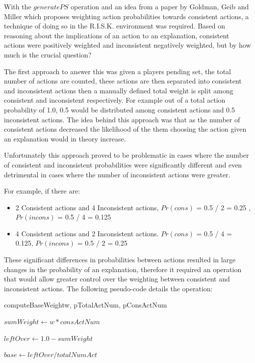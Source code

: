 \documentclass[parskip]{cs4rep}
\begin{document}
With the $generatePS$ operation and an idea from a paper by Goldman, Geib and Miller \cite{Goldman99anew} which proposes weighting action probabilities towards consistent actions, a technique of doing so in the R.I.S.K. environment was required. Based on reasoning about the implications of an action to an explanation, consistent actions were positively weighted and inconsistent negatively weighted, but by how much is the crucial question?

The first approach to answer this was given a players pending set, the total number of actions are counted, these actions are then separated into consistent and inconsistent actions then a manually defined total weight is split among consistent and inconsistent respectively. For example out of a total action probability of 1.0, 0.5 would be distributed among consistent actions and 0.5 inconsistent actions. The idea behind this approach was that as the number of consistent actions decreased the likelihood of the them choosing the action given an explanation would in theory increase.

Unfortunately this approach proved to be problematic in cases where the number of consistent and inconsistent probabilities were significantly different and even detrimental in cases where the number of inconsistent actions were greater. 

For example, if there are:

\begin{itemize}
\item
2 Consistent actions and 4 Inconsistent actions, $Pr(cons)$ = 0.5 / 2 = 0.25 , $Pr(incons)$ = 0.5 / 4 = 0.125 
\item
4 Consistent actions and 2 Inconsistent actions. $Pr(cons)$ = 0.5 / 4 = 0.125, $Pr(incons)$ = 0.5 / 2 = 0.25
\end{itemize}

These significant differences in probabilities between actions resulted in large changes in the probability of an explanation, therefore it required an operation that would allow greater control over the weighting between consistent and inconsistent actions. The following pseudo-code details the operation:

\begin{pseudocode}[ruled]{computeBaseWeight}{w, pTotalActNum, pConsActNum}
\begin{algorithm}[H]

$sumWeight \gets w * consActNum$

$leftOver \gets 1.0 - sumWeight$

$base \gets leftOver / totalNumAct$

\end{algorithm}
\end{pseudocode}
\end{document}
